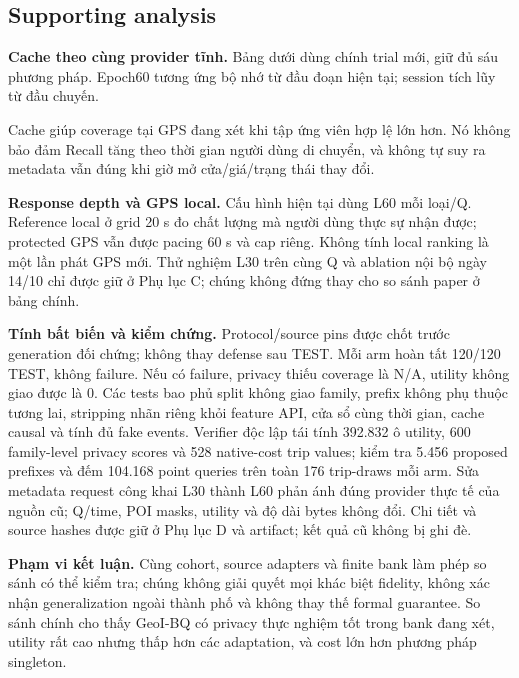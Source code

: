 \subsection{Supporting analysis}
\textbf{Cache theo cùng provider tĩnh.} Bảng dưới dùng chính trial mới, giữ đủ sáu phương pháp.
Epoch60 tương ứng bộ nhớ từ đầu đoạn hiện tại; session tích lũy từ đầu chuyến.

Cache giúp coverage tại GPS đang xét khi tập ứng viên hợp lệ lớn hơn. Nó không bảo đảm Recall tăng theo
thời gian người dùng di chuyển, và không tự suy ra metadata vẫn đúng khi giờ mở cửa/giá/trạng thái thay đổi.

\textbf{Response depth và GPS local.} Cấu hình hiện tại dùng L60 mỗi loại/Q. Reference local ở grid 20 s
đo chất lượng mà người dùng thực sự nhận được; protected GPS vẫn được pacing 60 s và cap riêng.
Không tính local ranking là một lần phát GPS mới. Thử nghiệm L30 trên cùng Q và ablation nội bộ ngày
14/10 chỉ được giữ ở Phụ lục C; chúng không đứng thay cho so sánh paper ở bảng chính.

\textbf{Tính bất biến và kiểm chứng.} Protocol/source pins được chốt trước generation đối chứng;
không thay defense sau TEST. Mỗi arm hoàn tất 120/120 TEST, không failure. Nếu có failure,
privacy thiếu coverage là N/A, utility không giao được là 0. Các tests bao phủ split không giao family, prefix không phụ thuộc
tương lai, stripping nhãn riêng khỏi feature API, cửa sổ cùng thời gian, cache causal và tính đủ fake events.
Verifier độc lập tái tính 392.832 ô utility, 600 family-level privacy scores và 528 native-cost trip values;
kiểm tra 5.456 proposed prefixes và đếm 104.168 point queries trên toàn 176 trip-draws mỗi arm.
Sửa metadata request công khai
L30 thành L60 phản ánh đúng provider thực tế của nguồn cũ; Q/time, POI masks, utility và độ dài bytes không đổi.
Chi tiết và source hashes được giữ ở Phụ lục D và artifact; kết quả cũ không bị ghi đè.

\textbf{Phạm vi kết luận.} Cùng cohort, source adapters và finite bank làm phép so sánh có thể kiểm tra;
chúng không giải quyết mọi khác biệt fidelity, không xác nhận generalization ngoài thành phố và không
thay thế formal guarantee. So sánh chính cho thấy GeoI-BQ có privacy thực nghiệm tốt trong bank đang xét,
utility rất cao nhưng thấp hơn các adaptation, và cost lớn hơn phương pháp singleton.
